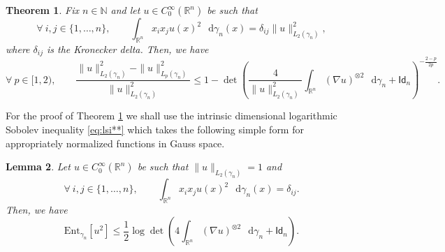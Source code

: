 \documentclass[a4paper,twoside,11pt,reqno]{amsart}
\newtheorem{theorem}{Theorem}
\newtheorem{lemma}[theorem]{Lemma}
\newcommand*\diff{\mathop{}\!\mathrm{d}}
\newcommand{\R}{\mathbb{R}} %
\newcommand{\N}{\mathbb{N}}
\newcommand{\msf}{\mathsf}
\begin{document}
\begin{theorem} \label{thm:beckner_sec}
Fix $n\in\N$ and let $u\in C_0^\infty(\R^n)$ be such that
\begin{equation}
\forall \ i,j\in\{1,\ldots,n\},\qquad \int_{\R^n} x_i x_j u(x)^2 \,\diff\gamma_n(x) = \delta_{ij} \|u\|_{L_2(\gamma_n)}^2,
\end{equation}
where $\delta_{ij}$ is the Kronecker delta. Then, we have
\begin{equation} \label{eq:dt*_sec}
\forall \ p\in[1,2),\qquad \frac{\|u\|_{L_2(\gamma_n)}^2-\|u\|_{L_p(\gamma_n)}^2}{\|u\|_{L_2(\gamma_n)}^2} \leq 1-\det\left(\frac{4}{\|u\|_{L_2(\gamma_n)}^2} \int_{\R^n} (\nabla u)^{\otimes 2} \,\diff\gamma_n + \msf{Id}_n\right)^{-\frac{2-p}{2p}}.
\end{equation}
\end{theorem}

For the proof of Theorem \ref{thm:beckner_sec} we shall use the intrinsic dimensional logarithmic Sobolev inequality \eqref{eq:lsi**} which takes the following simple form for appropriately normalized functions in Gauss space.

\begin{lemma} \label{lem:beckner}
Let $u\in C_0^\infty(\R^n)$ be such that $\|u\|_{L_2(\gamma_n)}=1$ and 
\begin{equation} \label{eq:lem-constr}
\forall \ i,j\in\{1,\ldots,n\},\qquad \int_{\R^n} x_i x_j u(x)^2 \,\diff\gamma_n(x) = \delta_{ij}.
\end{equation}
Then, we have
\begin{equation} \label{eq:lem-beckner}
\mathrm{Ent}_{\gamma_n}[u^2] \leq \frac{1}{2} \log\det \left( 4 \int_{\R^n} (\nabla u)^{\otimes 2} \,\diff \gamma_n + \msf{Id}_n \right).
\end{equation}
\end{lemma}
\end{document}
